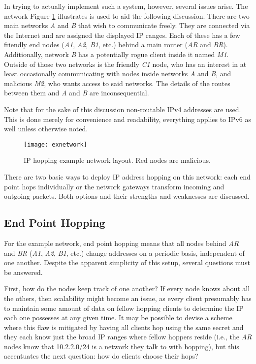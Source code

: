 \par In trying to actually implement such a system, however, several issues arise.  The network Figure \ref{fig:exnetwork} illustrates is used to aid the following discussion. There are two main networks \textit{A} and \textit{B} that wish to communicate freely. They are connected via the Internet and are assigned the displayed IP ranges. Each of these has a few friendly end nodes (\textit{A1}, \textit{A2}, \textit{B1}, etc.) behind a main router (\textit{AR} and \textit{BR}). Additionally, network \textit{B} has a potentially rogue client inside it named \textit{M1}. Outside of those two networks is the friendly \textit{C1} node, who has an interest in at least occasionally communicating with nodes inside networks \textit{A} and \textit{B}, and malicious \textit{M2}, who wants access to said networks. The details of the routes between them and \textit{A} and \textit{B} are inconsequential.

\par Note that for the sake of this discussion non-routable \ac{IPv4} addresses are used. This is done merely for convenience and readability, everything applies to \ac{IPv6} as well unless otherwise noted.

\begin{figure}
	\centering
	\texttt{[image: exnetwork]}
	\caption[\ac{IP} hopping example network]{\ac{IP} hopping example network layout. Red nodes are malicious.}
	\label{fig:exnetwork}
\end{figure}

\par There are two basic ways to deploy IP address hopping on this network: each end point hops individually or the network gateways transform incoming and outgoing packets. Both options and their strengths and weaknesses are discussed.

\subsection{End Point Hopping}
\par For the example network, end point hopping means that all nodes behind \textit{AR} and \textit{BR} (\textit{A1}, \textit{A2}, \textit{B1}, etc.) change addresses on a periodic basis, independent of one another. Despite the apparent simplicity of this setup, several questions must be answered.

\par First, how do the nodes keep track of one another? If every node knows about all the others, then scalability might become an issue, as every client presumably has to maintain some amount of data on fellow hopping clients to determine the \ac{IP} each one possesses at any given time. It may be possible to devise a scheme where this flaw is mitigated by having all clients hop using the same secret and they each know just the broad IP ranges where fellow hoppers reside (i.e., the \textit{AR} nodes know that 10.2.2.0/24 is a network they talk to with hopping), but this accentuates the next question: how do clients choose their hops?

